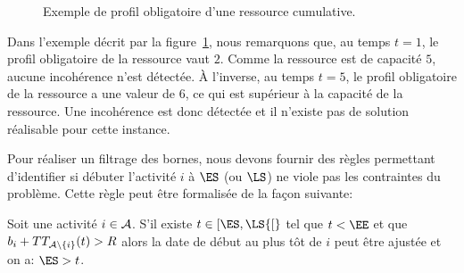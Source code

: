 \begin{ex}
  \begin{figure}[!htb]
    \centering
    \caption{Exemple de profil obligatoire d'une ressource cumulative.}
    \label{fig_profil_CUSP}
  \end{figure}
  Dans l'exemple décrit par la figure~\ref{fig_profil_CUSP}, nous
  remarquons que, au temps $t=1$, le profil obligatoire de la
  ressource vaut $2$. Comme la ressource est de capacité $5$, aucune
  incohérence n'est détectée. À l'inverse, au temps $t=5$, le profil
  obligatoire de la ressource a une valeur de $6$, ce qui est
  supérieur à la capacité de la ressource. Une incohérence est donc
  détectée et il n'existe pas de solution réalisable pour cette
  instance. 
\end{ex}

Pour réaliser un filtrage des bornes, nous devons fournir des règles
permettant d'identifier si débuter l'activité $i$ à $\ES$ (ou $\LS$)
ne viole pas les contraintes du problème. Cette règle peut être
formalisée de la façon suivante: 

\begin{reg}
\label{reg:TT}
Soit une activité $i \in {\cal A}$. S'il existe $t \in [\ES,\LS{[}$ tel que
$t < \EE$ et que $b_i + TT_{{\cal A} \setminus\{i\}}(t) > R$ alors la date
de début au plus tôt de $i$ peut être ajustée et on a: $ \ES > t$.
\end{reg}

